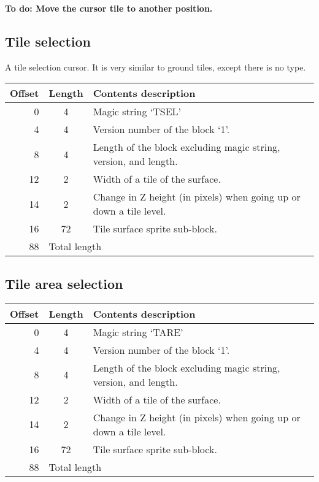 \documentclass{article}
\begin{document}
\textbf{To do: Move the cursor tile to another position.}

\subsection{Tile selection}
A tile selection cursor. It is very similar to ground tiles, except there is
no type.

\begin{center}
\begin{tabular}{|r|c|l|} \hline
\textbf{Offset} & \textbf{Length} & \textbf{Contents description} \\ \hline
   0 &  4 & Magic string `TSEL' \\
   4 &  4 & Version number of the block `1'. \\
   8 &  4 & Length of the block excluding magic string, version, and length. \\
  12 &  2 & Width of a tile of the surface. \\
  14 &  2 & Change in Z height (in pixels) when going up or down a tile level. \\
  16 & 72 & Tile surface sprite sub-block. \\ \hline
  88 & \multicolumn{2}{l|}{Total length} \\ \hline
\end{tabular}
\end{center}

\subsection{Tile area selection}
\begin{center}
\begin{tabular}{|r|c|l|} \hline
\textbf{Offset} & \textbf{Length} & \textbf{Contents description} \\ \hline
   0 &  4 & Magic string `TARE' \\
   4 &  4 & Version number of the block `1'. \\
   8 &  4 & Length of the block excluding magic string, version, and length. \\
  12 &  2 & Width of a tile of the surface. \\
  14 &  2 & Change in Z height (in pixels) when going up or down a tile level. \\
  16 & 72 & Tile surface sprite sub-block. \\ \hline
  88 & \multicolumn{2}{l|}{Total length} \\ \hline
\end{tabular}
\end{center}
\end{document}

